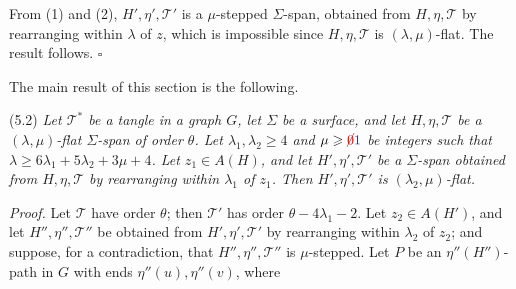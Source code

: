 From (1) and (2), $H', \eta', \mathscr{T}'$ is a $\mu$-stepped $\Sigma$-span, obtained from $H, \eta, \mathscr{T}$ by rearranging within $\lambda$ of $z$, which is impossible since $H, \eta, \mathscr{T}$ is $(\lambda, \mu)$-flat. The result follows. $\square$

The main result of this section is the following.

\stmt
(5.2) \textit{Let $\mathscr{T}^*$ be a tangle in a graph $G$, let $\Sigma$ be a surface, and let $H, \eta, \mathscr{T}$ be a $(\lambda, \mu)$-flat $\Sigma$-span of order $\theta$. Let $\lambda_1, \lambda_2 \ge 4$ and $\mu \ge \delm{0}\fix{1}$ be integers such that $\lambda \ge 6\lambda_1 + 5\lambda_2 + 3\mu + 4$. Let $z_1 \in A(H)$, and let $H', \eta', \mathscr{T}'$ be a $\Sigma$-span obtained from $H, \eta, \mathscr{T}$ by rearranging within $\lambda_1$ of $z_1$. Then $H', \eta', \mathscr{T}'$ is $(\lambda_2, \mu)$-flat.}

\textit{Proof.} Let $\mathscr{T}$ have order $\theta$; then $\mathscr{T}'$ has order $\theta - 4\lambda_1 - 2$. Let $z_2 \in A(H')$, and let $H'', \eta'', \mathscr{T}''$ be obtained from $H', \eta', \mathscr{T}'$ by rearranging within $\lambda_2$ of $z_2$; and suppose, for a contradiction, that $H'', \eta'', \mathscr{T}''$ is $\mu$-stepped. Let $P$ be an $\eta''(H'')$-path in $G$ with ends $\eta''(u), \eta''(v)$, where
